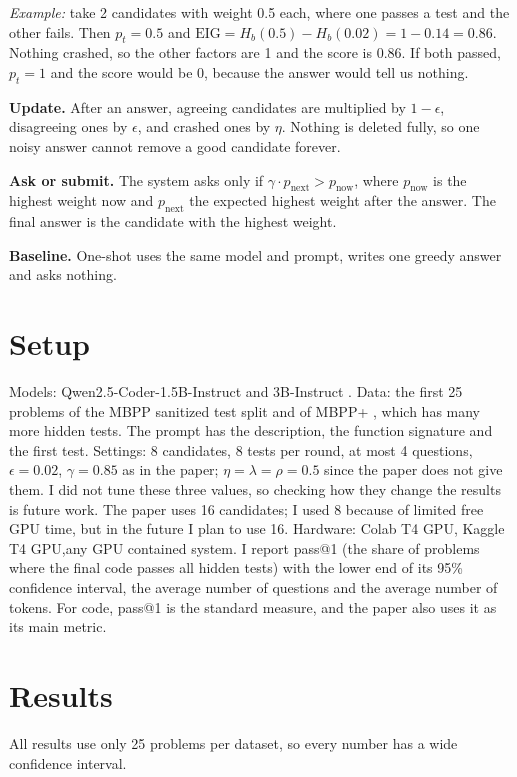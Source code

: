 \documentclass[11pt]{article}
\begin{document}
\textit{Example:} take 2 candidates with weight 0.5 each, where one passes a test and the other fails. Then $p_t = 0.5$ and $\text{EIG} = H_b(0.5) - H_b(0.02) = 1 - 0.14 = 0.86$. Nothing crashed, so the other factors are 1 and the score is 0.86. If both passed, $p_t = 1$ and the score would be 0, because the answer would tell us nothing.

\textbf{Update.} After an answer, agreeing candidates are multiplied by $1-\epsilon$, disagreeing ones by $\epsilon$, and crashed ones by $\eta$. Nothing is deleted fully, so one noisy answer cannot remove a good candidate forever.

\textbf{Ask or submit.} The system asks only if $\gamma \cdot p_{\text{next}} > p_{\text{now}}$, where $p_{\text{now}}$ is the highest weight now and $p_{\text{next}}$ the expected highest weight after the answer. The final answer is the candidate with the highest weight.

\textbf{Baseline.} One-shot uses the same model and prompt, writes one greedy answer and asks nothing.

\section{Setup}
Models: Qwen2.5-Coder-1.5B-Instruct and 3B-Instruct \cite{qwen}. Data: the first 25 problems of the MBPP sanitized test split \cite{mbpp} and of MBPP+ \cite{evalplus}, which has many more hidden tests. The prompt has the description, the function signature and the first test. Settings: 8 candidates, 8 tests per round, at most 4 questions, $\epsilon=0.02$, $\gamma=0.85$ as in the paper; $\eta=\lambda=\rho=0.5$ since the paper does not give them. I did not tune these three values, so checking how they change the results is future work. The paper uses 16 candidates; I used 8 because of limited free GPU time, but in the future I plan to use 16. Hardware: Colab T4 GPU, Kaggle T4 GPU,any GPU contained system. I report pass@1 (the share of problems where the final code passes all hidden tests) with the lower end of its 95\% confidence interval, the average number of questions and the average number of tokens. For code, pass@1 is the standard measure, and the paper \cite{garg} also uses it as its main metric.

\section{Results}
All results use only 25 problems per dataset, so every number has a wide confidence interval.
\end{document}
